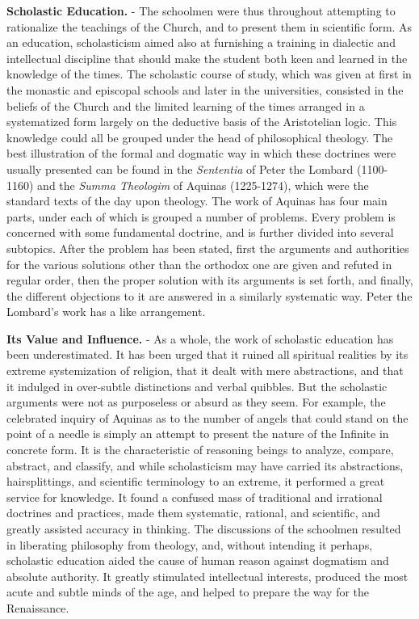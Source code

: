 \documentclass[]{book}
\begin{document}
\textbf{Scholastic Education.} - The schoolmen were thus throughout attempting to rationalize the teachings of the Church, and to present them in scientific form. As an education, scholasticism aimed also at furnishing a training in dialectic and intellectual discipline that should make the student both keen and learned in the knowledge of the times. The scholastic course of study, which was given at first in the monastic and episcopal schools and later in the universities, consisted in the beliefs of the Church and the limited learning of the times arranged in a systematized form largely on the deductive basis of the Aristotelian logic. This knowledge could all be grouped under the head of philosophical theology. The best illustration of the formal and dogmatic way in which these doctrines were usually presented can be found in the \emph{Sententia} of Peter the Lombard (1100-1160) and the \emph{Summa Theologim} of Aquinas (1225-1274), which were the standard texts of the day upon theology. The work of Aquinas has four main parts, under each of which is grouped a number of problems. Every problem is concerned with some fundamental doctrine, and is further divided into several subtopics. After the problem has been stated, first the arguments and authorities for the various solutions other than the orthodox one are given and refuted in regular order, then the proper solution with its arguments is set forth, and finally, the different objections to it are answered in a similarly systematic way. Peter the Lombard's work has a like arrangement.

\textbf{Its Value and Influence.} - As a whole, the work of scholastic education has been underestimated. It has been urged that it ruined all spiritual realities by its extreme systemization of religion, that it dealt with mere abstractions, and that it indulged in over-subtle distinctions and verbal quibbles. But the scholastic arguments were not as purposeless or absurd as they seem. For example, the celebrated inquiry of Aquinas as to the number of angels that could stand on the point of a needle is simply an attempt to present the nature of the Infinite in concrete form. It is the characteristic of reasoning beings to analyze, compare, abstract, and classify, and while scholasticism may have carried its abstractions, hairsplittings, and scientific terminology to an extreme, it performed a great service for knowledge. It found a confused mass of traditional and irrational doctrines and practices, made them systematic, rational, and scientific, and greatly assisted accuracy in thinking. The discussions of the schoolmen resulted in liberating philosophy from theology, and, without intending it perhaps, scholastic education aided the cause of human reason against dogmatism and absolute authority. It greatly stimulated intellectual interests, produced the most acute and subtle minds of the age, and helped to prepare the way for the Renaissance.
\end{document}

